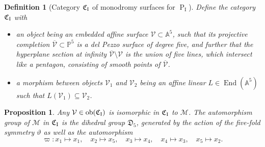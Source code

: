 \documentclass[a4paper,reqno]{amsart}
\numberwithin{equation}{section}
\newcommand{\p}{\mathbb{P}}
\newcommand{\pain}[1]{\operatorname{P}_{\mathrm{#1}}}
\newtheorem{definition}[theorem]{Definition}
\newtheorem{proposition}[theorem]{Proposition}
\numberwithin{equation}{section}
\begin{document}
\begin{definition}[Category $\mathfrak{C}_{\rm{I}}$ of monodromy surfaces for $\pain{I}$]
Define the category $\mathfrak{C}_{\rm{I}}$ with 
\begin{itemize}
    \item an object being an embedded affine surface $\mathcal{V}\subset \mathbb{A}^5$, such that its projective completion $\overline{\mathcal{V}}\subset \p^5$ is a del Pezzo surface of degree five, and further that the hyperplane section at infinity $\overline{\mathcal{V}}\setminus \mathcal{V}$ is the union of five lines, which intersect like a pentagon, consisting of smooth points of $\overline{\mathcal{V}}$.
    \item a morphism between objects $\mathcal{V}_1$ and $\mathcal{V}_2$ being an affine linear $L\in\operatorname{End}(\mathbb{A}^5)$ such that $L(\mathcal{V}_1)\subseteq\mathcal{V}_2$.
\end{itemize}
\end{definition}

\begin{proposition} \label{prop:oblomkovstylenormalformPI}
    Any $\mathcal{V}\in \operatorname{ob}(\mathfrak{C}_{\rm I})$ is isomorphic in $\mathfrak{C}_{\rm I}$ to $\mathcal{M}$.  
    The automorphism group of $\mathcal{M}$ in $\mathfrak{C}_{\rm I}$ is the dihedral group $\mathfrak{D}_5$, generated by the action of the five-fold symmetry $\vartheta$ as well as the automorphism
    $$\varpi : x_1 \mapsto x_1,\quad x_2\mapsto x_5, \quad x_3 \mapsto x_4, \quad x_4\mapsto x_3, \quad x_5 \mapsto x_2.$$
    
    
\end{proposition}
\end{document}

